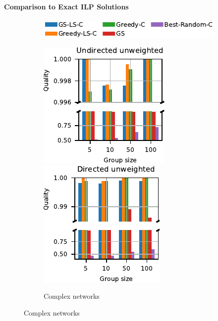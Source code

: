 \paragraph{Comparison to Exact ILP Solutions}
%
\begin{figure}[tb]
\centering
\begin{subfigure}[t]{\textwidth}
\centering
\includegraphics{./sources/plots/gh-gc-apx/legend-exact-closeness.pdf}
\end{subfigure}\smallskip

\begin{subfigure}[t]{\textwidth}
\centering
\includegraphics[width=.24\textwidth]{./sources/plots/gh-gc-apx/quality-ilp-small-diameter-undirected-unweighted.pdf}
\includegraphics[width=.24\textwidth]{./sources/plots/gh-gc-apx/quality-ilp-small-diameter-directed-unweighted.pdf}
\caption{Complex networks}
\label{fig:gh-gc-apx:qual-vs-opt-gc-cplx}
\end{subfigure}\medskip


\end{figure}
